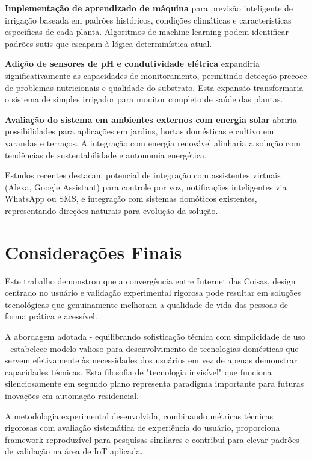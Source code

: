 \textbf{Implementação de aprendizado de máquina} para previsão inteligente de irrigação baseada em padrões históricos, condições climáticas e características específicas de cada planta. Algoritmos de machine learning podem identificar padrões sutis que escapam à lógica determinística atual.

\textbf{Adição de sensores de pH e condutividade elétrica} expandiria significativamente as capacidades de monitoramento, permitindo detecção precoce de problemas nutricionais e qualidade do substrato. Esta expansão transformaria o sistema de simples irrigador para monitor completo de saúde das plantas.

\textbf{Avaliação do sistema em ambientes externos com energia solar} abriria possibilidades para aplicações em jardins, hortas domésticas e cultivo em varandas e terraços. A integração com energia renovável alinharia a solução com tendências de sustentabilidade e autonomia energética.

Estudos recentes destacam potencial de integração com assistentes virtuais (Alexa, Google Assistant) para controle por voz, notificações inteligentes via WhatsApp ou SMS, e integração com sistemas domóticos existentes, representando direções naturais para evolução da solução.

\section{Considerações Finais}

Este trabalho demonstrou que a convergência entre Internet das Coisas, design centrado no usuário e validação experimental rigorosa pode resultar em soluções tecnológicas que genuinamente melhoram a qualidade de vida das pessoas de forma prática e acessível.

A abordagem adotada - equilibrando sofisticação técnica com simplicidade de uso - estabelece modelo valioso para desenvolvimento de tecnologias domésticas que servem efetivamente às necessidades dos usuários em vez de apenas demonstrar capacidades técnicas. Esta filosofia de "tecnologia invisível" que funciona silenciosamente em segundo plano representa paradigma importante para futuras inovações em automação residencial.

A metodologia experimental desenvolvida, combinando métricas técnicas rigorosas com avaliação sistemática de experiência do usuário, proporciona framework reproduzível para pesquisas similares e contribui para elevar padrões de validação na área de IoT aplicada.

